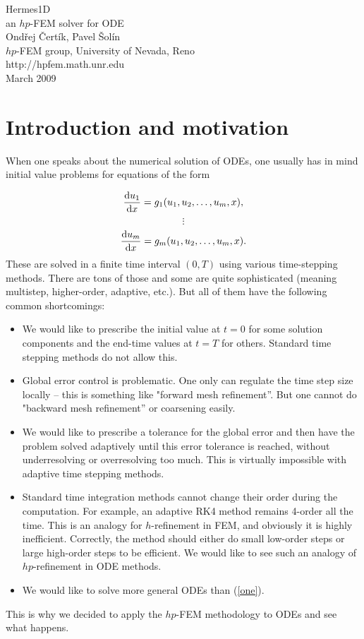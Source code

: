 \documentclass[12pt]{article}
\def\be{\begin{equation}}
\def\ee{\end{equation}}
\def\d{\mbox{d}}
\begin{document}
\begin{center}
{\huge Hermes1D}\\[2mm]
{\Large an $hp$-FEM solver for ODE}\\
\vspace{0.6cm}
Ondřej Čertík, Pavel Šolín\\
$hp$-FEM group, University of Nevada, Reno\\
http://hpfem.math.unr.edu\\
March 2009
\end{center}

\section{Introduction and motivation}

When one speaks about the numerical solution of ODEs, one 
usually has in mind initial value problems for equations 
of the form 

$$
{\d u_1\over\d x}=g_1(u_1, u_2, \dots, u_m, x),
$$
\be\label{one}
\vdots
\ee
$$
{\d u_m\over\d x}=g_m(u_1, u_2, \dots, u_m, x).
$$
These are solved in a finite time interval $(0,T)$ using various time-stepping 
methods. There are tons of those and some are quite sophisticated (meaning 
multistep, higher-order, adaptive, etc.). But all of them have the following 
common shortcomings:
\begin{itemize}
\item We would like to prescribe the initial value at $t = 0$ for some solution 
      components and the end-time values at $t = T$ for others. Standard 
      time stepping methods do not allow this.
\item Global error control is problematic. One only can regulate the time step
      size locally -- this is something like 
      "forward mesh refinement''. But one cannot do "backward mesh refinement''
      or coarsening easily. 
\item We would like to prescribe a tolerance for the global error and then 
      have the problem solved adaptively until this error tolerance is reached,
      without underresolving or overresolving too much. This is virtually 
      impossible with adaptive time stepping methods. 
\item Standard time integration methods cannot change their order during the 
      computation. For example, an adaptive RK4 method remains 4-order 
      all the time. This is an analogy for $h$-refinement in FEM, and obviously 
      it is highly inefficient. Correctly, the method should either do small low-order
      steps or large high-order steps to be efficient. We would like to see such an 
      analogy of $hp$-refinement in ODE methods. 
\item We would like to solve more general ODEs than (\ref{one}).
\end{itemize}
This is why we decided to apply the $hp$-FEM methodology to ODEs and see what happens.
\end{document}
